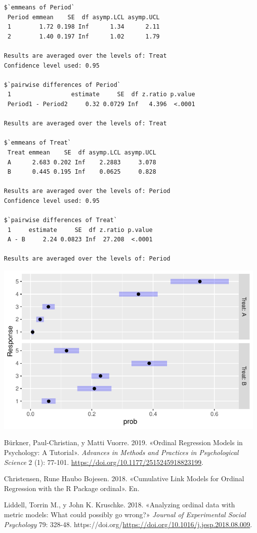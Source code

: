 \documentclass[
  letterpaper,
  DIV=11,
  numbers=noendperiod]{scrartcl}
\newlength{\cslhangindent}
\newlength{\cslentryspacingunit} %
\newenvironment{CSLReferences}[2] %
 {%
  \setlength{\parindent}{0pt}
  \ifodd #1
  \let\oldpar\par
  \def\par{\hangindent=\cslhangindent\oldpar}
  \fi
  \setlength{\parskip}{#2\cslentryspacingunit}
 }%
 {}
\begin{document}
\begin{verbatim}
$`emmeans of Period`
 Period emmean    SE  df asymp.LCL asymp.UCL
 1        1.72 0.198 Inf      1.34      2.11
 2        1.40 0.197 Inf      1.02      1.79

Results are averaged over the levels of: Treat 
Confidence level used: 0.95 

$`pairwise differences of Period`
 1                 estimate     SE  df z.ratio p.value
 Period1 - Period2     0.32 0.0729 Inf   4.396  <.0001

Results are averaged over the levels of: Treat 

$`emmeans of Treat`
 Treat emmean    SE  df asymp.LCL asymp.UCL
 A      2.683 0.202 Inf    2.2883     3.078
 B      0.445 0.195 Inf    0.0625     0.828

Results are averaged over the levels of: Period 
Confidence level used: 0.95 

$`pairwise differences of Treat`
 1     estimate     SE  df z.ratio p.value
 A - B     2.24 0.0823 Inf  27.208  <.0001

Results are averaged over the levels of: Period 
\end{verbatim}

\includegraphics{ordinal_files/figure-pdf/unnamed-chunk-26-1.pdf}

\hypertarget{refs}{}
\begin{CSLReferences}{1}{0}
\leavevmode{}%
Bürkner, Paul-Christian, y Matti Vuorre. 2019. {«Ordinal Regression
Models in Psychology: A Tutorial»}. \emph{Advances in Methods and
Practices in Psychological Science} 2 (1): 77-101.
\url{https://doi.org/10.1177/2515245918823199}.

\leavevmode{}%
Christensen, Rune Haubo Bojesen. 2018. {«Cumulative Link Models for
Ordinal Regression with the R Package ordinal»}. En.

\leavevmode{}%
Liddell, Torrin M., y John K. Kruschke. 2018. {«Analyzing ordinal data
with metric models: What could possibly go wrong?»} \emph{Journal of
Experimental Social Psychology} 79: 328-48.
https://doi.org/\url{https://doi.org/10.1016/j.jesp.2018.08.009}.

\end{CSLReferences}
\end{document}
